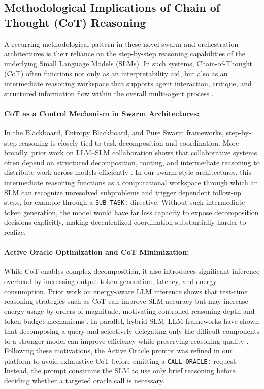 \subsection{Methodological Implications of Chain of Thought (CoT) Reasoning}

A recurring methodological pattern in these novel swarm and orchestration architectures is their reliance on the step-by-step reasoning capabilities of the underlying Small Language Models (SLMs). In such systems, Chain-of-Thought (CoT) often functions not only as an interpretability aid, but also as an intermediate reasoning workspace that supports agent interaction, critique, and structured information flow within the overall multi-agent process \cite{multiagent2025, debateagents2025}.

\paragraph{CoT as a Control Mechanism in Swarm Architectures:} In the Blackboard, Entropy Blackboard, and Pure Swarm frameworks, step-by-step reasoning is closely tied to task decomposition and coordination. More broadly, prior work on LLM--SLM collaboration shows that collaborative systems often depend on structured decomposition, routing, and intermediate reasoning to distribute work across models efficiently \cite{lee2024orchestrallm, chen2025collabmech}. In our swarm-style architectures, this intermediate reasoning functions as a computational workspace through which an SLM can recognize unresolved subproblems and trigger dependent follow-up steps, for example through a \texttt{SUB\_TASK:} directive. Without such intermediate token generation, the model would have far less capacity to expose decomposition decisions explicitly, making decentralized coordination substantially harder to realize.


\paragraph{Active Oracle Optimization and CoT Minimization:} While CoT enables complex decomposition, it also introduces significant inference overhead by increasing output-token generation, latency, and energy consumption. Prior work on energy-aware LLM inference shows that test-time reasoning strategies such as CoT can improve SLM accuracy but may increase energy usage by orders of magnitude, motivating controlled reasoning depth and token-budget mechanisms \cite{energytoken2025}. In parallel, hybrid SLM--LLM frameworks have shown that decomposing a query and selectively delegating only the difficult components to a stronger model can improve efficiency while preserving reasoning quality \cite{shao2025dot}. Following these motivations, the Active Oracle prompt was refined in our platform to avoid exhaustive CoT before emitting a \texttt{CALL\_ORACLE:} request. Instead, the prompt constrains the SLM to use only brief reasoning before deciding whether a targeted oracle call is necessary.


